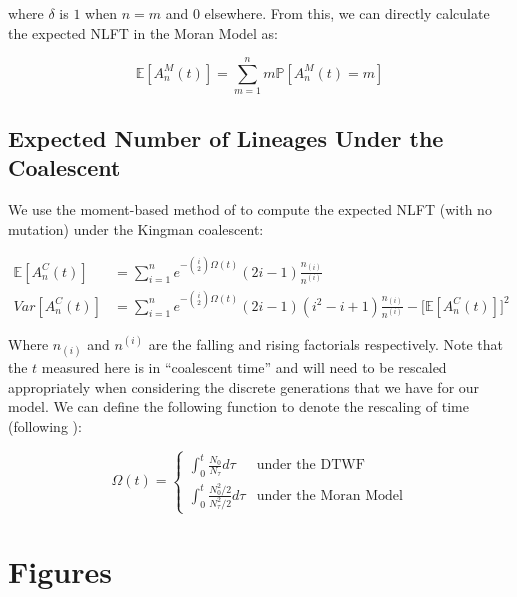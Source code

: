 \documentclass[10.5pt]{article}
\begin{document}
where $\delta$ is $1$ when $n = m$ and $0$ elsewhere. From this, we can directly calculate the expected NLFT in the Moran Model as:

 \begin{equation}
	 \mathbb{E}[A^M_n(t)] = \sum^n_{m=1} m \mathbb{P}[A^M_n (t) = m]
 \end{equation}


\subsection{Expected Number of Lineages Under the Coalescent}

We use the moment-based method of \citet{Tavare1984} to compute the expected NLFT (with no mutation) under the Kingman coalescent:

\begin{equation}
\begin{aligned}
	\mathbb{E}[A^C_n(t)] &= \sum^n_{i=1} e^{-\binom{i}{2}\Omega(t)} (2i - 1) \frac{n_{(i)}}{n^{(i)}}\\
	Var[A^C_n(t)] &= \sum^n_{i=1} e^{-\binom{i}{2}\Omega(t)}(2i-1)(i^2 - i + 1)\frac{n_{(i)}}{n^{(i)}} - \Bigg[\mathbb{E}[A^C_n(t)]\Bigg]^2
\end{aligned}
\end{equation}

Where $n_{(i)}$ and $n^{(i)}$ are the falling and rising factorials respectively. Note that the $t$ measured here is in ``coalescent time'' and will need to be rescaled appropriately when considering the discrete generations that we have for our model. We can define the following function to denote the rescaling of time (following \citet{Bhaskar2014}):

\begin{equation}
	\Omega(t) = \begin{cases}
		\int_{0}^t \frac{N_0}{N_\tau} d\tau &\text{under the DTWF}\\[2ex]
		\int_{0}^t \frac{N_0^2/2}{N_\tau^2/2} d\tau  &\text{under the Moran Model}
	\end{cases}
\end{equation}





\section{Figures}
\end{document}
